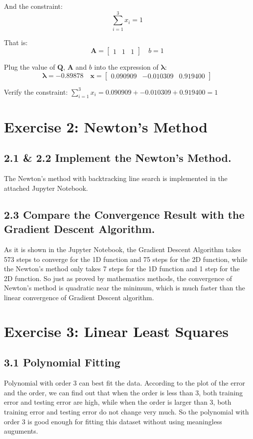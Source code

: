 \documentclass{article}
\newcommand{\V}[1]{\boldsymbol{#1}}
\begin{document}
And the constraint:
\[ \sum_{i = 1}^{3} x_i = 1 \]

That is:
\[
\V{A} =
    \begin{bmatrix}
        1 & 1 & 1
    \end{bmatrix}
\quad b = 1
\]

Plug the value of \( \V{Q} \), \( \V{A} \) and \( b \) into the expression of \( \V{\lambda} \):
\[
\V{\lambda} = -0.89878
\quad
\V{x} =
    \begin{bmatrix}
        0.090909 & -0.010309 & 0.919400
    \end{bmatrix}
\]

Verify the constraint: \( \sum_{i = 1}^{3} x_i = 0.090909 + -0.010309 + 0.919400 = 1 \)

\section*{Exercise 2: Newton’s Method}

\subsection*{2.1 \& 2.2 Implement the Newton’s Method.}
The Newton’s method with backtracking line search is implemented in the attached Jupyter Notebook.

\subsection*{2.3 Compare the Convergence Result with the Gradient Descent Algorithm.}
As it is shown in the Jupyter Notebook, the Gradient Descent Algorithm takes 573 steps to converge for the 1D function and 75 steps for the 2D function, while the Newton’s method only takes 7 steps for the 1D function and 1 step for the 2D function. So just as proved by mathematics methods, the convergence of Newton’s method is quadratic near the minimum, which is much faster than the linear convergence of Gradient Descent algorithm.

\section*{Exercise 3: Linear Least Squares}

\subsection*{3.1 Polynomial Fitting}
Polynomial with order 3 can best fit the data. According to the plot of the error and the order, we can find out that when the order is less than 3, both training error and testing error are high, while when the order is larger than 3, both training error and testing error do not change very much. So the polynomial with order 3 is good enough for fitting this dataset without using meaningless auguments.
\end{document}
